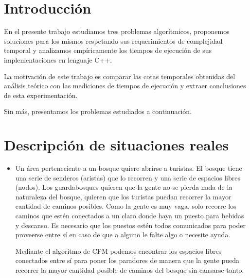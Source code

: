 \documentclass[a4paper, 10pt, twoside]{article}
\begin{document}
\newpage




\tableofcontents

\newpage




\section{Introducción}

En el presente trabajo estudiamos tres problemas algorítmicos, proponemos soluciones para los mismos respetando sus requerimientos de complejidad temporal y analizamos empíricamente los tiempos de ejecución de sus implementaciones en lenguaje C++.

La motivación de este trabajo es comparar las cotas temporales obtenidas del análisis teórico con las mediciones de tiempos de ejecución y extraer conclusiones de esta experimentación.

Sin más, presentamos los problemas estudiados a continuación.




\newpage

\section{Descripción de situaciones reales}
\begin{itemize}
\item Un área perteneciente a un bosque quiere abrirse a turistas. El bosque tiene una serie de senderos (aristas) que lo recorren y una serie de espacios libres (nodos). Los guardabosques quieren que la gente no se pierda nada de la naturaleza del bosque, quieren que los turistas puedan recorrer la mayor cantidad de caminos posibles. Como la gente es muy vaga, solo recorre los caminos que estén conectados a un claro donde haya un puesto para bebidas y descanso. Es necesario que los puestos estén todos comunicados para poder proveerse entre sí en caso de que a alguno le falte algo o necesite ayuda. 

Mediante el algoritmo de CFM podemos encontrar los espacios libres conectados entre sí para poner los paradores de manera que la gente pueda recorrer la mayor cantidad posible de caminos del bosque sin cansarse tanto.
\end{itemize}
\end{document}
